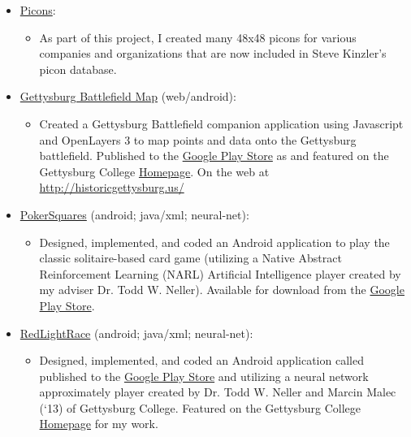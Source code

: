 \documentclass[11pt]{article}
\begin{document}
\begin{itemize}
\begin{itemize}
	\end{itemize}
	\item \href{https://github.com/JohnDDuncanIII/picons}{Picons}: 
	\begin{itemize}
	\item As part of this project, I created many 48x48 picons for various companies and organizations that are now included in Steve Kinzler's picon database.
	\end{itemize}
	\item \href{https://github.com/JohnDDuncanIII/GettysburgMonumentsMap}{Gettysburg Battlefield Map} (web/android): 
	\begin{itemize}
	\item Created a Gettysburg Battlefield companion application using Javascript and OpenLayers 3 to map points and data onto the Gettysburg battlefield. Published to the \href{https://play.google.com/store/apps/details?id=edu.gettysburg.MonumentsMap}{Google Play Store} as  and featured on the Gettysburg College \href{http://www.gettysburg.edu/news_events/press_release_detail.dot?id=6bb9e711-cbbd-4c0d-98c8-ca379ebc5321}{Homepage}. On the web at \url{http://historicgettysburg.us/}
	\end{itemize}
	\item \href{https://github.com/JohnDDuncanIII/PokerSquares}{PokerSquares} (android; java/xml; neural-net): 
	\begin{itemize}
	\item Designed, implemented, and coded an Android application to play the classic solitaire-based card game  (utilizing a Native Abstract Reinforcement Learning (NARL) Artificial Intelligence player created by my adviser Dr. Todd W. Neller). Available for download from the \href{https://play.google.com/store/apps/details?id=edu.gettysburg.pokersquares}{Google Play Store}.
	\end{itemize}
	\item \href{https://github.com/JohnDDuncanIII/RedLightRace}{RedLightRace} (android; java/xml; neural-net): 
	\begin{itemize}
	\item Designed, implemented, and coded an Android application called  published to the \href{https://play.google.com/store/apps/details?id=edu.gettysburg.redlight}{Google Play Store} and utilizing a neural network approximately player created by Dr. Todd W. Neller and Marcin Malec (‘13) of Gettysburg College. Featured on the Gettysburg College \href{http://www.gettysburg.edu/news_events/press_release_detail.dot?id=16f6ea27-401c-42b2-bf77-c5c8ab319ee1}{Homepage} for my work.

\end{itemize}
\end{itemize}
\end{document}
